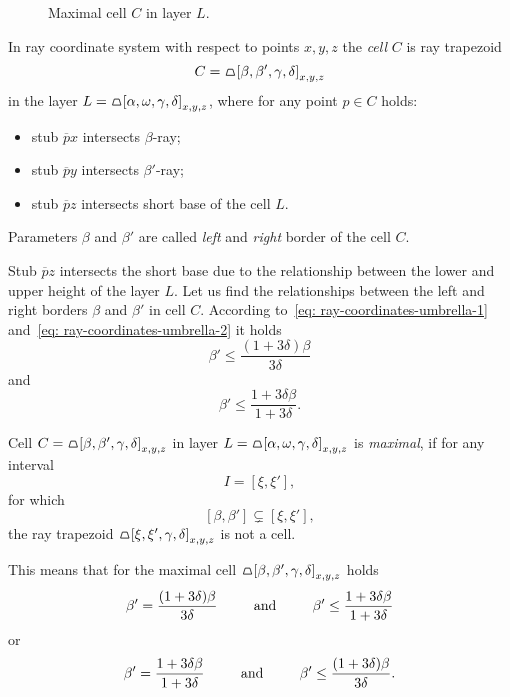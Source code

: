 \begin{figure}
\begin{center}

\end{center}
\caption{Maximal cell $C$ in layer $L$.}
\label{fig: layer-L}
\end{figure}

\begin{definition}[Cell]
In ray coordinate system with respect to points $x,y,z$ the \textit{cell} $C$ is ray trapezoid
$$
C = \tpz{\left[ \beta,\beta',\gamma,\delta \right]_{x,y,z} }
$$
in the layer $L = \tpz{\left[ \alpha,\omega,\gamma,\delta \right]_{x,y,z} }$, where for any point $p \in C$ holds:
\begin{itemize}
  \item stub $\overline{p}x$ intersects $\beta$-ray;
  \item stub $\overline{p}y$ intersects $\beta'$-ray;
  \item stub $\overline{p}z$ intersects short base of the cell $L$.
\end{itemize}
Parameters $\beta$ and $\beta'$ are called \textit{left} and \textit{right} border of the cell $C$.
\end{definition}

Stub $\overline{p}z$ intersects the short base due to the relationship between the lower and upper height of the layer $L$.
Let us find the relationships between the left and right borders $\beta$ and $\beta'$ in cell $C$. According to~\eqref{eq: ray-coordinates-umbrella-1} and~\eqref{eq: ray-coordinates-umbrella-2} it holds
$$
\beta' \leq \frac{(1+3\delta)\beta}{3\delta}
$$
and
$$
\beta' \leq \frac{1+3\delta\beta}{1+3\delta}.
$$

\begin{definition}
Cell $C = \tpz{\left[ \beta,\beta',\gamma,\delta \right]_{x,y,z} }$ in layer $L = \tpz{\left[ \alpha,\omega,\gamma,\delta \right]_{x,y,z} }$ is \textit{maximal}, if for any interval
$$
I = \left[ \xi, \xi' \right],
$$
for which
$$
\left[ \beta, \beta' \right] \subsetneq \left[ \xi, \xi' \right],
$$
the ray trapezoid $\tpz{\left[ \xi,\xi',\gamma,\delta \right]_{x,y,z} }$ is not a cell.
\end{definition}

This means that for the maximal cell $\tpz{\left[ \beta,\beta',\gamma,\delta \right]_{x,y,z} }$ holds
$$
\beta' = \frac{(1+3\delta)\beta}{3\delta} \text{\hspace{0.8cm}   and   \hspace{0.8cm}} \beta' \leq \frac{1+3\delta\beta}{1+3\delta}
$$
or
$$
\beta' = \frac{1+3\delta\beta}{1+3\delta} \text{\hspace{0.8cm}   and   \hspace{0.8cm}} \beta' \leq \frac{(1+3\delta)\beta}{3\delta}.
$$

